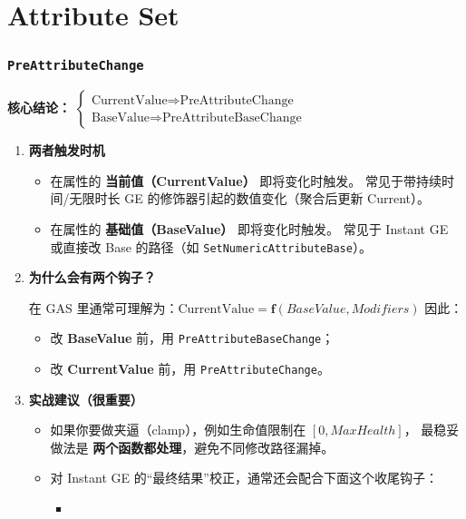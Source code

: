 \documentclass[10pt,CJKmath]{ctexart}
\begin{document}
	\pagestyle{fancynotes}
	\part{Attribute Set}

\section{\texttt{PreAttributeChange}}

\textbf{核心结论：}
$\begin{cases}
	\text{CurrentValue}\Rightarrow\text{PreAttributeChange} \\
	\text{BaseValue}\Rightarrow\text{PreAttributeBaseChange}
\end{cases}$


\begin{enumerate}
	\item \textbf{两者触发时机}

\begin{itemize}
	\item {}在属性的 \textbf{当前值（CurrentValue）} 即将变化时触发。  
	常见于带持续时间/无限时长 GE 的修饰器引起的数值变化（聚合后更新 Current）。
	
	\item {}
	在属性的 \textbf{基础值（BaseValue）} 即将变化时触发。  
	常见于 Instant GE 或直接改 Base 的路径（如 \texttt{SetNumericAttributeBase}）。
\end{itemize}

\item \textbf{为什么会有两个钩子？}

在 GAS 里通常可理解为：\colorbox{yellow!5}{$
\text{CurrentValue} = \mathbf{f}(BaseValue, Modifiers)
$}
因此：
\begin{itemize}
	\item 改 \textbf{BaseValue} 前，用 \texttt{PreAttributeBaseChange}；
	\item 改 \textbf{CurrentValue} 前，用 \texttt{PreAttributeChange}。
\end{itemize}

\item \textbf{实战建议（很重要）}

\begin{itemize}
	\item 如果你要做夹逼（clamp），例如生命值限制在 \([0, MaxHealth]\)，
	最稳妥做法是 \textbf{两个函数都处理}，避免不同修改路径漏掉。
	\item 对 Instant GE 的“最终结果”校正，通常还会配合下面这个收尾钩子：
	\begin{itemize}
		\item {}
	\end{itemize}
\end{itemize}
\end{enumerate}
\end{document}
